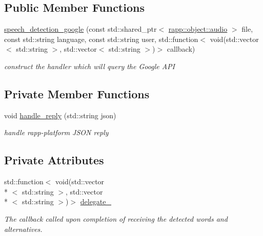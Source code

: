 \subsection*{Public Member Functions}
\begin{DoxyCompactItemize}
\item 
\hyperlink{classrapp_1_1cloud_1_1speech__detection__google_a3a28dbcee0c87b651b4c04b0d0a9d0ac}{speech\-\_\-detection\-\_\-google} (const std\-::shared\-\_\-ptr$<$ \hyperlink{classrapp_1_1object_1_1audio}{rapp\-::object\-::audio} $>$ file, const std\-::string language, const std\-::string user, std\-::function$<$ void(std\-::vector$<$ std\-::string $>$, std\-::vector$<$ std\-::string $>$)$>$ callback)
\begin{DoxyCompactList}\small\item\em construct the handler which will query the Google A\-P\-I \end{DoxyCompactList}\end{DoxyCompactItemize}
\subsection*{Private Member Functions}
\begin{DoxyCompactItemize}
\item 
void \hyperlink{classrapp_1_1cloud_1_1speech__detection__google_a62bc378ebda856ce72370a8888867994}{handle\-\_\-reply} (std\-::string json)
\begin{DoxyCompactList}\small\item\em handle rapp-\/platform J\-S\-O\-N reply \end{DoxyCompactList}\end{DoxyCompactItemize}
\subsection*{Private Attributes}
\begin{DoxyCompactItemize}
\item 
std\-::function$<$ void(std\-::vector\\*
$<$ std\-::string $>$, std\-::vector\\*
$<$ std\-::string $>$)$>$ \hyperlink{classrapp_1_1cloud_1_1speech__detection__google_ab5e6f6510bd6ff397a719423faa56780}{delegate\-\_\-}
\begin{DoxyCompactList}\small\item\em The callback called upon completion of receiving the detected words and alternatives. \end{DoxyCompactList}\end{DoxyCompactItemize}
